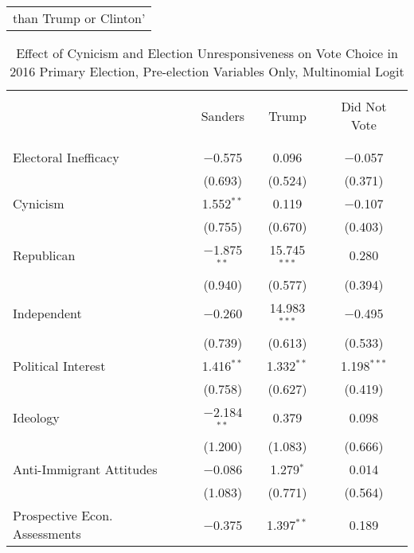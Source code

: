 \documentclass[12pt]{article}
\begin{document}
\begin{appendices}
\begin{refsection}
\begin{table}[!t]
\begin{adjustbox}{width=0.6\textwidth,center}
\begin{tabular}{@{\extracolsep{5pt}}lccc}
\multicolumn{4}{l}{\footnotesize \hspace{2pt} than Trump or Clinton'} \\
\end{tabular} 
\end{adjustbox}
\end{table}



\begin{table}[!t] \centering 
  \caption{Effect of Cynicism and Election Unresponsiveness on Vote Choice in 2016 Primary Election, Pre-election Variables Only, Multinomial Logit} 
  \label{tab:primary-pre} 
   \renewcommand{\arraystretch}{1}
\begin{adjustbox}{width=0.6\textwidth,center}
\begin{tabular}{@{\extracolsep{5pt}}lccc} 
\\[-1.8ex]\hline 
 \\[-2ex] 
 & Sanders & Trump & Did Not Vote \\ 
\hline \\[-1.8ex] 
\hline \\[-1.8ex] 
 Electoral Inefficacy & $-$0.575 & 0.096 & $-$0.057 \\ 
  & (0.693) & (0.524) & (0.371) \\ 
 Cynicism & 1.552$^{**}$ & 0.119 & $-$0.107 \\ 
  & (0.755) & (0.670) & (0.403) \\ 
 Republican & $-$1.875$^{**}$ & 15.745$^{***}$ & 0.280 \\ 
  & (0.940) & (0.577) & (0.394) \\ 
 Independent & $-$0.260 & 14.983$^{***}$ & $-$0.495 \\ 
  & (0.739) & (0.613) & (0.533) \\ 
 Political Interest & 1.416$^{**}$ & 1.332$^{**}$ & 1.198$^{***}$ \\ 
  & (0.758) & (0.627) & (0.419) \\ 
 Ideology & $-$2.184$^{**}$ & 0.379 & 0.098 \\ 
  & (1.200) & (1.083) & (0.666) \\ 
 Anti-Immigrant Attitudes & $-$0.086 & 1.279$^{*}$ & 0.014 \\ 
  & (1.083) & (0.771) & (0.564) \\ 
 Prospective Econ. Assessments & $-$0.375 & 1.397$^{**}$ & 0.189 \\ 

\end{tabular}
\end{adjustbox}
\end{table}
\end{refsection}
\end{appendices}
\end{document}
